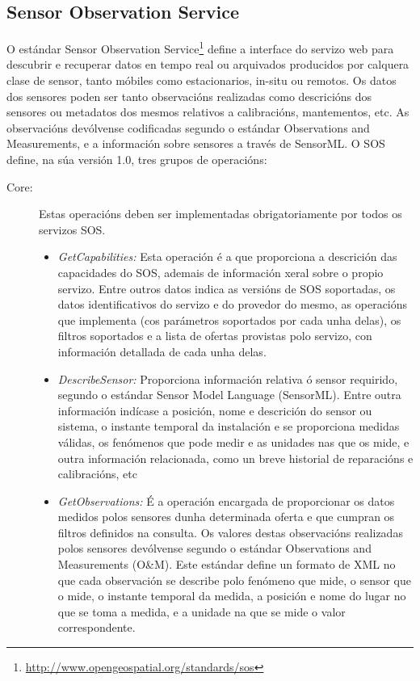 \subsection{Sensor Observation Service}
O estándar Sensor Observation Service\footnote{\url{http://www.opengeospatial.org/standards/sos}} define a interface do servizo web para descubrir e recuperar datos en tempo real ou arquivados producidos por calquera clase de sensor, tanto móbiles como estacionarios, in-situ ou remotos. Os datos dos sensores poden ser tanto observacións realizadas como descricións dos sensores ou metadatos dos mesmos relativos a calibracións, mantementos, etc. As observacións devólvense codificadas segundo o estándar Observations and Measurements, e a información sobre sensores a través de SensorML. O SOS define, na súa versión 1.0, tres grupos de operacións:
\begin{description}
\item[Core:] Estas operacións deben ser implementadas obrigatoriamente por todos os servizos SOS.
\begin{itemize}
\item \textit{GetCapabilities:} Esta operación é a que proporciona a descrición das capacidades do SOS, ademais de información xeral sobre o propio servizo. Entre outros datos indica as versións de SOS soportadas, os datos identificativos do servizo e do provedor do mesmo, as operacións que implementa (cos parámetros soportados por cada unha delas), os filtros soportados e a lista de ofertas provistas polo servizo, con información detallada de cada unha delas.
\item \textit{DescribeSensor:} Proporciona información relativa ó sensor requirido, segundo o estándar Sensor Model Language (SensorML). Entre outra información indícase a posición, nome e descrición do sensor ou sistema, o instante temporal da instalación e se proporciona medidas válidas, os fenómenos que pode medir e as unidades nas que os mide, e outra información relacionada, como un breve historial de reparacións e
calibracións, etc
\item \textit{GetObservations:} É a operación encargada de proporcionar os datos medidos polos sensores dunha determinada oferta e que cumpran os filtros definidos na consulta. Os valores destas observacións realizadas polos sensores devólvense segundo o estándar Observations and Measurements (O\&M). Este estándar define un formato de XML no que cada observación se describe polo fenómeno que mide, o sensor que o mide, o instante temporal da medida, a posición e nome do lugar no que se toma a medida, e a unidade na que se mide o valor correspondente.

\end{itemize}
\end{description}

